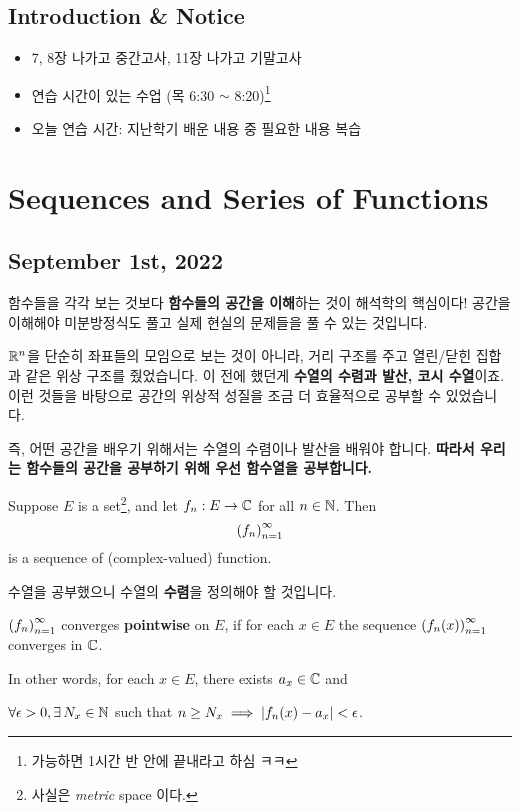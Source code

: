 \section*{Introduction \& Notice}

\begin{itemize}
    \item 7, 8장 나가고 중간고사, 11장 나가고 기말고사
    \item 연습 시간이 있는 수업 (목 6:30 \(\sim\) 8:20)\footnote{가능하면 1시간 반 안에 끝내라고 하심 ㅋㅋ}
    \item 오늘 연습 시간: 지난학기 배운 내용 중 필요한 내용 복습
\end{itemize}

\chapter{Sequences and Series of Functions}

\section*{September 1st, 2022}

함수들을 각각 보는 것보다 \textbf{함수들의 공간을 이해}하는 것이 해석학의 핵심이다! 공간을 이해해야 미분방정식도 풀고 실제 현실의 문제들을 풀 수 있는 것입니다.

\(\mathbb{R}^n\)을 단순히 좌표들의 모임으로 보는 것이 아니라, 거리 구조를 주고 열린/닫힌 집합과 같은 위상 구조를 줬었습니다. 이 전에 했던게 \textbf{수열의 수렴과 발산, 코시 수열}이죠. 이런 것들을 바탕으로 공간의 위상적 성질을 조금 더 효율적으로 공부할 수 있었습니다.

즉, 어떤 공간을 배우기 위해서는 수열의 수렴이나 발산을 배워야 합니다. \textbf{따라서 우리는 함수들의 공간을 공부하기 위해 우선 함수열을 공부합니다.}

\medskip

Suppose \(E\) is a set\footnote{사실은 \textit{metric} space 이다.}, and let \(f_n: E \rightarrow \mathbb{C}\) for all \(n \in \mathbb{N}\). Then
\[
    \left( f_n \right)_{n=1}^\infty
\]
is a sequence of (complex-valued) function.

\medskip

수열을 공부했으니 수열의 \textbf{수렴}을 정의해야 할 것입니다.

  \(\left( f_n \right)_{n = 1}^\infty\) converges \textbf{pointwise} on \(E\), if for each \(x \in E\) the sequence \(\left( f_n(x) \right)_{n=1}^\infty\) converges in \(\mathbb{C}\).

In other words, for each \(x \in E\), there exists \(a_x \in \mathbb{C}\) and
\begin{center}
    \(\forall \epsilon > 0, \exists N_x \in \N\) such that \(n \geq N_x \implies \left| f_n(x) - a_x \right| < \epsilon\).
\end{center}

